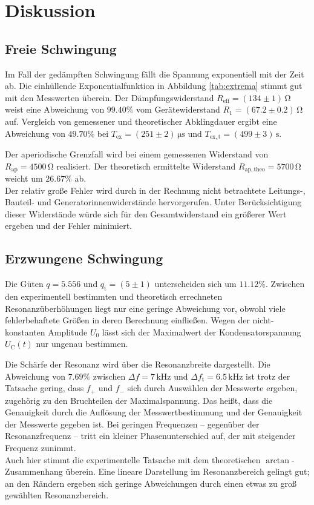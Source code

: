 \section{Diskussion}
\label{sec:Diskussion}
\subsection{Freie Schwingung}
Im Fall der gedämpften Schwingung fällt die Spannung exponentiell mit der Zeit ab. 
Die einhüllende Exponentialfunktion in Abbildung \ref{tab:extrema} stimmt gut mit den Messwerten überein. 
Der Dämpfungswiderstand $R_\mathup{eff}=(134\pm1)\,\si{\ohm}$ weist eine Abweichung von $99.40\%$ vom Gerätewiderstand $R_1=(67.2\pm0.2)\,\si{\ohm}$ auf.
Vergleich von gemessener und theoretischer Abklingdauer ergibt eine Abweichung von $49.70\%$ bei $T_\mathup{ex}=(251\pm2)\,\si{\micro\second}$ und $T_\mathup{ex,t}=(499\pm3)\,\si\second$. 

Der aperiodische Grenzfall wird bei einem gemessenen Widerstand von $R_\mathup{ap}=4500\,\si\ohm$ realisiert. 
Der theoretisch ermittelte Widerstand $R_\mathup{ap,theo}=5700\,\si\ohm$ weicht um $26.67\%$ ab.\\
Der relativ große Fehler wird durch in der Rechnung nicht betrachtete Leitungs-, Bauteil- und Generatorinnenwiderstände hervorgerufen. 
Unter Berücksichtigung dieser Widerstände würde sich für den Gesamtwiderstand ein größerer Wert ergeben und der Fehler minimiert.

\subsection{Erzwungene Schwingung}
Die Güten $q=5.556$ und $q_\mathup{t}=(5\pm1)$ unterscheiden sich um $11.12\%$.
Zwischen den experimentell bestimmten und theoretisch errechneten Resonanzüberhöhungen liegt nur eine geringe Abweichung vor, obwohl viele fehlerbehaftete Größen in deren Berechnung einfließen. 
Wegen der nicht-konstanten Amplitude $U_0$ lässt sich der Maximalwert der Kondensatorspannung $U_\mathup{C}(t)$ nur ungenau bestimmen. 

Die Schärfe der Resonanz wird über die Resonanzbreite dargestellt. 
Die Abweichung von $7.69\%$ zwischen $\Delta{f}=7\,\si{\kilo\hertz}$ und $\Delta{f_\mathup{t}}=6.5\,\si{\kilo\hertz}$ 
ist  trotz der Tatsache gering, dass $f_+$ und $f_-$ sich durch Auswählen der Messwerte ergeben, zugehörig zu den Bruchteilen der Maximalspannung. 
Das heißt, dass die Genauigkeit durch die Auflösung der Messwertbestimmung und der Genauigkeit der Messwerte gegeben ist.
Bei geringen Frequenzen -- gegenüber der Resonanzfrequenz -- tritt ein kleiner Phasenunterschied auf, der mit steigender Frequenz zunimmt. \\
Auch hier stimmt die experimentelle Tatsache mit dem theoretischen $\arctan$-Zusammenhang überein. 
Eine lineare Darstellung im Resonanzbereich gelingt gut; 
an den Rändern ergeben sich geringe Abweichungen durch einen etwas zu groß gewählten Resonanzbereich.

